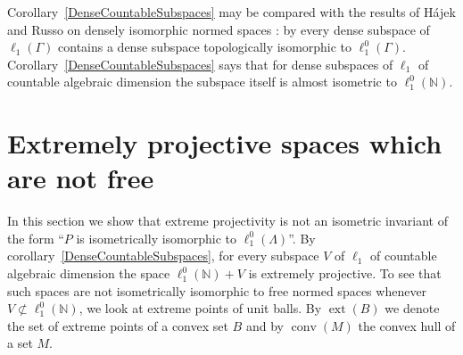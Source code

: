 \documentclass[12pt]{article}
\newcommand{\lo}[1]{\ell_1^0(#1)}
\newcommand{\ellone}[1]{\ell_1(#1)}
\newcommand{\ext}{\operatorname{ext}}
\newcommand{\conv}{\operatorname{conv}}
\begin{document}
Corollary~\ref{DenseCountableSubspaces} may be compared with the results of
H\'ajek and Russo on densely isomorphic normed spaces
\cite{HajekRussoDenselyIsom}: by \cite[theorem 2.4]{HajekRussoDenselyIsom}
every dense subspace of $\ellone{\Gamma}$ contains a dense subspace
topologically isomorphic to $\lo{\Gamma}$. Corollary~\ref{DenseCountableSubspaces}
says that for dense subspaces of $\ell_1$ of countable algebraic dimension
the subspace itself is almost isometric to $\lo{\mathbb{N}}$.


\section{Extremely projective spaces which are not free}\label{SectionCounterexample}

In this section we show that extreme projectivity is not an isometric
invariant of the form ``$P$ is isometrically isomorphic to $\lo{\Lambda}$''.
By corollary~\ref{DenseCountableSubspaces}, for every subspace $V$ of $\ell_1$
of countable algebraic dimension the space $\lo{\mathbb{N}}+V$ is extremely
projective. To see that such spaces are not isometrically isomorphic to free normed
spaces whenever $V\not\subset\lo{\mathbb{N}}$, we look at extreme points of
unit balls. By $\ext(B)$ we denote the set of extreme points of a convex set
$B$ and by $\conv(M)$ the convex hull of a set $M$.
\end{document}
